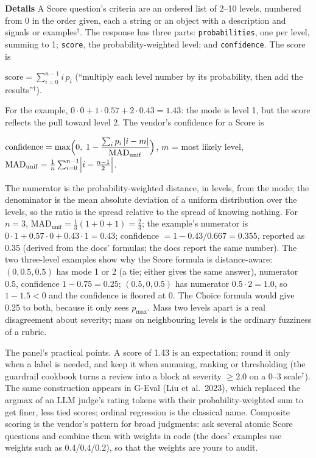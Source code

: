 \documentclass[11pt,letterpaper]{article}
\newcommand{\para}[1]{\medskip\noindent\textbf{#1}\quad}
\newenvironment{formulas}{\begin{tcolorbox}[formulabox]}{\end{tcolorbox}}
\newcommand{\pmax}{p_{\max}}
\begin{document}
\para{Details} A Score question's criteria are an ordered list of 2--10 levels, numbered from 0 in the order given, each a string or an object with a description and signals or examples$^\dagger$. The response has three parts: \texttt{probabilities}, one per level, summing to 1; \texttt{score}, the probability-weighted level; and \texttt{confidence}. The score is
\begin{formulas}
$\displaystyle \mathrm{score}=\sum_{i=0}^{n-1} i\,p_i$ \qquad (``multiply each level number by its probability, then add the results''$^\dagger$).
\end{formulas}
For the example, $0\cdot0+1\cdot0.57+2\cdot0.43=1.43$: the mode is level 1, but the score reflects the pull toward level 2. The vendor's confidence for a Score is
\begin{formulas}
$\displaystyle \mathrm{confidence}=\max\Bigl(0,\;1-\frac{\sum_i p_i\,|i-m|}{\mathrm{MAD}_{\mathrm{unif}}}\Bigr)$, \qquad $m$ = most likely level, \quad $\mathrm{MAD}_{\mathrm{unif}}=\frac1n\sum_{i=0}^{n-1}\Bigl|i-\frac{n-1}{2}\Bigr|$.
\end{formulas}
The numerator is the probability-weighted distance, in levels, from the mode; the denominator is the mean absolute deviation of a uniform distribution over the levels, so the ratio is the spread relative to the spread of knowing nothing. For $n=3$, $\mathrm{MAD}_{\mathrm{unif}}=\tfrac13(1+0+1)=\tfrac23$; the example's numerator is $0\cdot1+0.57\cdot0+0.43\cdot1=0.43$; confidence $=1-0.43/0.667=0.355$, reported as 0.35 (derived from the docs' formulas; the docs report the same number). The two three-level examples show why the Score formula is distance-aware: $(0,0.5,0.5)$ has mode 1 or 2 (a tie; either gives the same answer), numerator 0.5, confidence $1-0.75=0.25$; $(0.5,0,0.5)$ has numerator $0.5\cdot2=1.0$, so $1-1.5<0$ and the confidence is floored at 0. The Choice formula would give 0.25 to both, because it only sees $\pmax$. Mass two levels apart is a real disagreement about severity; mass on neighbouring levels is the ordinary fuzziness of a rubric.

The panel's practical points. A score of 1.43 is an expectation; round it only when a label is needed, and keep it when summing, ranking or thresholding (the guardrail cookbook turns a review into a block at severity $\geq2.0$ on a 0--3 scale$^\dagger$). The same construction appears in G-Eval (Liu et al.\ 2023), which replaced the argmax of an LLM judge's rating tokens with their probability-weighted sum to get finer, less tied scores; ordinal regression is the classical name. Composite scoring is the vendor's pattern for broad judgments: ask several atomic Score questions and combine them with weights in code (the docs' examples use weights such as 0.4/0.4/0.2), so that the weights are yours to audit.
\end{document}
